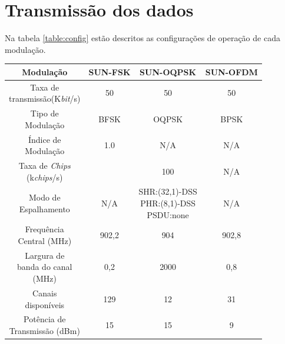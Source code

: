\section{Transmissão dos dados}
Na tabela \ref{table:config} estão descritos as configurações de operação de cada modulação.
\begin{table}[h!]
    \centering
    \begin{tabular}{|c c c c|}
        \hline
        Modulação & SUN-FSK & SUN-OQPSK & SUN-OFDM \\ [0.5ex]
        \hline\hline
        \makecell{Taxa de                          \\transmissão(K\emph{bit}/s)    } & 50      & 50                       & 50       \\\hline
        \makecell{Tipo de                          \\Modulação                     } & BFSK    & OQPSK                    & BPSK     \\\hline
        \makecell{Índice de                        \\Modulação                   } & 1.0     & N/A                      & N/A      \\\hline
        \makecell{Taxa de \emph{Chips}             \\(k\emph{chips}/s) } &         & 100                      & N/A      \\\hline
        \makecell{Modo de                          \\Espalhamento                  } & N/A     & \makecell{SHR:(32,1)-DSS            \\ PHR:(8,1)-DSS\\ PSDU:none} & N/A      \\\hline
        \makecell{Frequência                       \\Central (MHz)              } & 902,2   & 904                      & 902,8    \\\hline
        \makecell{Largura de                       \\banda do canal                                                               \\(MHz)        } & 0,2     & 2000                     & 0,8      \\\hline
        \makecell{Canais                           \\disponíveis                    } & 129     & 12                       & 31       \\\hline
        \makecell{Potência de                      \\Transmissão (dBm)         } & 15      & 15                       & 9        \\\hline

\end{tabular}
\end{table}
